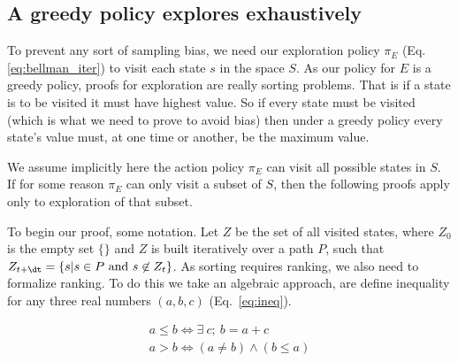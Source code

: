 \subsection*{A greedy policy explores exhaustively} To prevent any sort of sampling bias, we need our exploration policy $\pi_E$ (Eq.\ref{eq:bellman_iter}) to visit each state $s$ in the space $S$. As our policy for $E$ is a greedy policy, proofs for exploration are really sorting problems. That is if a state is to be visited it must have highest value. So if every state must be visited (which is what we need to prove to avoid bias) then under a greedy policy every state's value must, at one time or another, be the maximum value. 

We assume implicitly here the action policy $\pi_E$ can visit all possible states in $S$. If for some reason $\pi_E$ can only visit a subset of $S$, then the following proofs apply only to exploration of that subset.

To begin our proof, some notation. Let $Z$ be the set of all visited states, where $Z_0$ is the empty set $\{\}$ and $Z$ is built iteratively over a path $P$, such that $Z_{t+\dt} = \{s | s \in P\ \text{and}\ s \not\in Z_t\}$. As sorting requires ranking, we also need to formalize ranking. To do this we take an algebraic approach, are define inequality for any three real numbers $(a,b,c)$ (Eq.~\ref{eq:ineq}). 

\begin{align}\label{eq:ineq} 
	a \leq b \Leftrightarrow \exists \ c;\ b = a + c \\
	a > b \Leftrightarrow (a \neq b) \wedge (b \leq a) 
\end{align}

